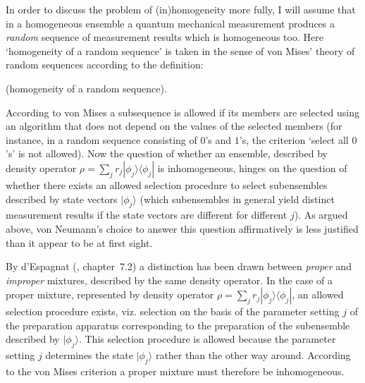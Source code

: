 \documentclass[12pt]{article}
\begin{document}
In order to discuss the problem of (in)homogeneity more fully, I
will assume that in a homogeneous ensemble a quantum mechanical
measurement produces a {\em random} sequence of measurement
results which is homogeneous too. Here `homogeneity of a random
sequence' is taken in the sense of von Mises' theory of random
sequences \cite{Mises} according to the definition:

\medskip
{} (homogeneity of a random sequence).
\medskip

\noindent According to von Mises a subsequence is allowed if its
members are selected using an algorithm that does not depend on
the values of the selected members (for instance, in a random
sequence consisting of $0$'s and $1$'s, the criterion `select all
$0$'s' is not allowed). Now the question of whether an ensemble,
described by density operator $\rho= \sum_j r_j |\phi_j
\rangle\langle \phi_j|$ is inhomogeneous, hinges on the question
of whether there exists an allowed selection procedure to select
subensembles described by state vectors $|\phi_j \rangle$ (which
subensembles in general yield distinct measurement results if the
state vectors are different for different $j$). As argued above,
von Neumann's choice to answer this question affirmatively is less
justified than it appear to be at first sight.

By d'Espagnat (\cite{EspCFQM}, chapter~7.2) a distinction has been
drawn between {\em proper} and {\em improper} mixtures, described
by the same density operator. In the case of a proper mixture,
represented by density operator $\rho= \sum_j r_j |\phi_j \rangle
\langle \phi_j|$, an allowed selection procedure exists, viz.
selection on the basis of the parameter setting $j$ of the
preparation apparatus corresponding to the preparation of the
subensemble described by $|\phi_j\rangle$. This selection
procedure is allowed because the parameter setting $j$ determines
the state $|\phi_j \rangle$ rather than the other way around.
According to the von Mises criterion a proper mixture must
therefore be inhomogeneous.
\end{document}
